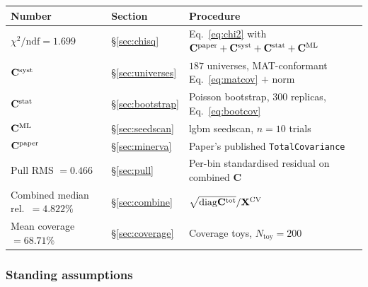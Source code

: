 \begin{center}
\begin{tabular}{@{}lll@{}}
\toprule
Number & Section & Procedure \\
\midrule
$\chi^{2}/\mathrm{ndf} = 1.699$ & \S\ref{sec:chisq} &
  Eq.~\eqref{eq:chi2} with $\mathbf{C}^{\text{paper}}+\mathbf{C}^{\text{syst}}+\mathbf{C}^{\text{stat}}+\mathbf{C}^{\text{ML}}$ \\
$\mathbf{C}^{\text{syst}}$ & \S\ref{sec:universes} &
  $187$ universes, MAT-conformant Eq.~\eqref{eq:matcov} $+$ norm \\
$\mathbf{C}^{\text{stat}}$ & \S\ref{sec:bootstrap} &
  Poisson bootstrap, $300$ replicas, Eq.~\eqref{eq:bootcov} \\
$\mathbf{C}^{\text{ML}}$ & \S\ref{sec:seedscan} & lgbm seedscan, $n=10$ trials \\
$\mathbf{C}^{\text{paper}}$ & \S\ref{sec:minerva} & Paper's published \texttt{TotalCovariance} \\
Pull RMS $= 0.466$ & \S\ref{sec:pull} &
  Per-bin standardised residual on combined $\mathbf{C}$ \\
Combined median rel.\ $= 4.822\%$ & \S\ref{sec:combine} &
  $\sqrt{\mathrm{diag}\mathbf{C}^{\text{tot}}}/\mathbf{X}^{\text{CV}}$ \\
Mean coverage $= 68.71\%$ & \S\ref{sec:coverage} &
  Coverage toys, $N_{\text{toy}}=200$ \\
\bottomrule
\end{tabular}
\end{center}

\subsubsection*{Standing assumptions}

